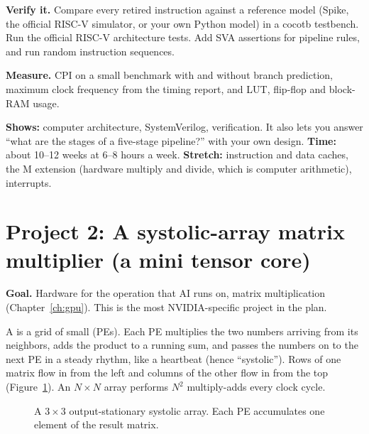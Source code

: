 \textbf{Verify it.} Compare every retired instruction against a reference model (Spike, the official RISC-V simulator, or your own Python model) in a cocotb testbench. Run the official RISC-V architecture tests. Add SVA assertions for pipeline rules, and run random instruction sequences.

\textbf{Measure.} CPI on a small benchmark with and without branch prediction, maximum clock frequency from the timing report, and LUT, flip-flop and block-RAM usage.

\textbf{Shows:} computer architecture, SystemVerilog, verification. It also lets you answer ``what are the stages of a five-stage pipeline?'' with your own design. \textbf{Time:} about 10--12 weeks at 6--8 hours a week. \textbf{Stretch:} instruction and data caches, the M extension (hardware multiply and divide, which is computer arithmetic), interrupts.

\section{Project 2: A systolic-array matrix multiplier (a mini tensor core)}

\textbf{Goal.} Hardware for the operation that AI runs on, matrix multiplication (Chapter~\ref{ch:gpu}). This is the most NVIDIA-specific project in the plan.

A  is a grid of small  (PEs). Each PE multiplies the two numbers arriving from its neighbors, adds the product to a running sum, and passes the numbers on to the next PE in a steady rhythm, like a heartbeat (hence ``systolic''). Rows of one matrix flow in from the left and columns of the other flow in from the top (Figure~\ref{fig:systolic}). An $N \times N$ array performs $N^2$ multiply-adds every clock cycle.

\begin{figure}[h]
\centering
{}
\caption{A $3 \times 3$ output-stationary systolic array. Each PE accumulates one element of the result matrix.}
\label{fig:systolic}
\end{figure}

